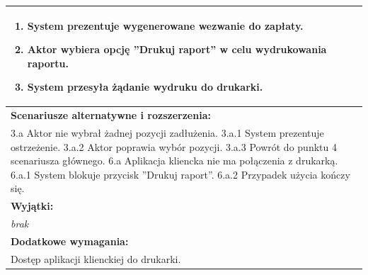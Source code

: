 \begin{center}
\begin{longtable}[h]{|p{1.6cm}|p{13.5cm}|}
{\begin{enumerate}
\item System prezentuje wygenerowane wezwanie do zapłaty.
\item Aktor wybiera opcję ''Drukuj raport'' w celu wydrukowania raportu.
\item System przesyła żądanie wydruku do drukarki.
\end{enumerate}
} \\ \hline
\multicolumn{2}{|p{15.1cm}|}{\textbf{Scenariusze alternatywne i rozszerzenia:}} \\
\multicolumn{2}{|p{15.1cm}|}{
3.a Aktor nie wybrał żadnej pozycji zadłużenia. \newline
3.a.1 System prezentuje ostrzeżenie. \newline
3.a.2 Aktor poprawia wybór pozycji. \newline
3.a.3 Powrót do punktu 4 scenariusza głównego. \newline
\newline
6.a Aplikacja kliencka nie ma połączenia z drukarką. \newline
6.a.1 System blokuje przycisk ''Drukuj raport''. \newline
6.a.2 Przypadek użycia kończy się. \newline
} \\ \hline
\multicolumn{2}{|p{15.1cm}|}{\textbf{Wyjątki:}} \\
\multicolumn{2}{|p{15.1cm}|}{
\textit{brak}} \\ \hline
\multicolumn{2}{|p{15.1cm}|}{\textbf{Dodatkowe wymagania:}} \\
\multicolumn{2}{|p{15.1cm}|}{
Dostęp aplikacji klienckiej do drukarki.
} \\
\hline
\end{longtable}
\end{center}

